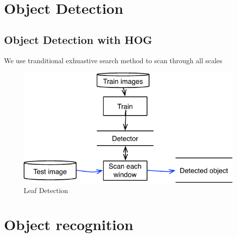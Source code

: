 \documentclass[journal]{IEEEtran}
\begin{document}
\section{Object Detection}
\subsection{Object Detection with HOG}
We use tranditional exhuastive search method to scan through all scales

\newpage
\begin{figure} 
  \center
  \includegraphics[scale=0.5]{detection}
  \caption{ Leaf Detection }
  \label{fig:detection}
\end{figure}


\section{Object recognition}
\end{document}

